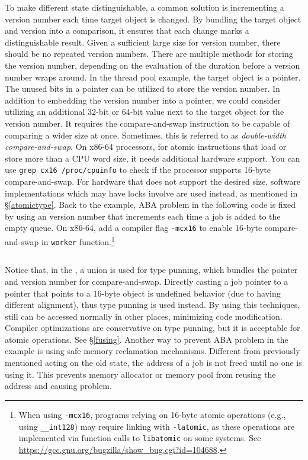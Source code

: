 \documentclass[fontsize=10pt, oneside]{scrartcl}
\newcommand{\monobox}[1]{\mbox{\texttt{#1}}}
\newcommand{\introduce}[1]{\textit{#1}}
\newcommand{\secref}[1]{\hyperref[#1]{\textsc{\S}\ref*{#1}}}
\begin{document}
To make different state distinguishable, a common solution is incrementing a version number each time target object is changed.
By bundling the target object and version into a comparison, it ensures that each change marks a distinguishable result.
Given a sufficient large size for version number, there should be no repeated version numbers.
There are multiple methods for storing the version number, depending on the evaluation of the duration before a version number wraps around.
In the thread pool example, the target object is a pointer. The unused bits in a pointer can be utilized to store the version number.
In addition to embedding the version number into a pointer, we could consider utilizing an additional 32-bit or 64-bit value next to the target object for the version number.
It requires the compare-and-swap instruction to be capable of comparing a wider size at once.
Sometimes, this is referred to as \introduce{double-width compare-and-swap}.
On x86-64 processors, for atomic instructions that load or store more than a CPU word size, it needs additional hardware support.
You can use \monobox{grep cx16 /proc/cpuinfo} to check if the processor supports 16-byte compare-and-swap.
For hardware that does not support the desired size, software implementations which may have locks involve are used instead, as mentioned in \secref{atomictype}.
Back to the example, ABA problem in the following code is fixed by using an version number that increments each time a job is added to the empty queue. On x86-64, add a compiler flag \monobox{-mcx16} to enable 16-byte compare-and-swap in \monobox{worker} function.\footnote{When using \texttt{-mcx16}, programs relying on 16-byte atomic operations (e.g., using \texttt{\_\_int128}) may require linking with \texttt{-latomic}, as these operations are implemented via function calls to \texttt{libatomic} on some systems. See \url{https://gcc.gnu.org/bugzilla/show_bug.cgi?id=104688}.}

\inputminted{c}{./examples/rmw_example_aba.c}

Notice that, in the , a union is used for type punning, which bundles the pointer and version number for compare-and-swap.
Directly casting a job pointer to a pointer that points to a 16-byte object is undefined behavior (due to having different alignment), thus type punning is used instead.
By using this techniques,  still can be accessed normally in other places, minimizing code modification.
Compiler optimizations are conservative on type punning, but it is acceptable for atomic operations.
See \secref{fusing}.
Another way to prevent ABA problem in the example is using safe memory reclamation mechanisms.
Different from previously mentioned acting on the old state, the address of a job is not freed until no one is using it.
This prevents memory allocator or memory pool from reusing the address and causing problem.
\end{document}
